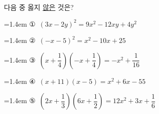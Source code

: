 다음 중 옳지 \underline{않은} 것은?
\par\medskip\par\noindent\hangindent=1.4em {\small ①}\ $(3x-2y)^2=9x^2-12xy+4y^2$\par\noindent\hangindent=1.4em {\small ②}\ $(-x-5)^2=x^2-10x+25$\par\noindent\hangindent=1.4em {\small ③}\ $\left(x+\dfrac{1}{4}\right)\left(-x+\dfrac{1}{4}\right)=-x^2+\dfrac{1}{16}$\par\noindent\hangindent=1.4em {\small ④}\ $(x+11)(x-5)=x^2+6x-55$\par\noindent\hangindent=1.4em {\small ⑤}\ $\left(2x+\dfrac{1}{3}\right)\left(6x+\dfrac{1}{2}\right)=12x^2+3x+\dfrac{1}{6}$\par\medskip
